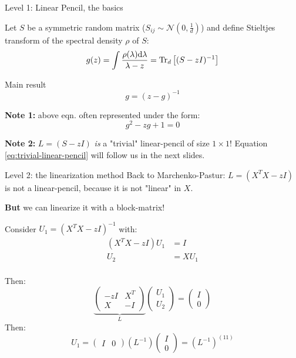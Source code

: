 \documentclass[10pt]{beamer}
\begin{document}
\begin{frame}{Level 1: Linear Pencil, the basics}

  Let $S$ be a symmetric random matrix ($S_{ij} \sim \mathcal N(0, \frac{1}{d})$) and define Stieltjes transform of the spectral density $\rho$ of $S$:
  $$ g(z) = \int \frac{\rho(\lambda) \dd \lambda}{\lambda - z} = \traceLim[d]{ (S - zI)^{-1}}$$

  \begin{block}{Main result \cite{wigner1958distribution}}
    \begin{equation}\label{eq:trivial-linear-pencil}
        g = (z-g)^{-1}
    \end{equation}
  \end{block}

  \textbf{Note 1:} above eqn. often represented under the form:
  $$g^2 - zg + 1 = 0$$

  \textbf{Note 2:} 
  $L=(S-zI)$ \emph{is} a "trivial" linear-pencil of size $1 \times 1$! 
  Equation \eqref{eq:trivial-linear-pencil} will follow us in the next slides.

\end{frame}


\begin{frame}{Level 2: the linearization method}
  Back to Marchenko-Pastur: $L = (X^TX - zI)$ is not a linear-pencil, because it is not "linear" in $X$.
  
  \textbf{But} we can linearize it with a block-matrix!

  Consider $U_1 = (X^TX - zI)^{-1}$ with:
  \begin{align*}
    (X^TX - zI) U_1 & = I\\
    U_2 & = X U_1\\
  \end{align*}

  Then:
  \begin{equation*}
    \underbrace{
    \begin{pmatrix}
      -zI & X^T\\
      X & -I
    \end{pmatrix}
    }_{L}
    \begin{pmatrix}
      U_1\\
      U_2
    \end{pmatrix}
    = \begin{pmatrix}
      I\\
      0
    \end{pmatrix}
  \end{equation*}
  Then:
  \begin{equation*}
    U_1 = \begin{pmatrix}
      I & 0
    \end{pmatrix}
    (L^{-1})
    \begin{pmatrix}
      I\\
      0
    \end{pmatrix}
    = (L^{-1})^{(11)}
  \end{equation*}
\end{frame}
\end{document}

